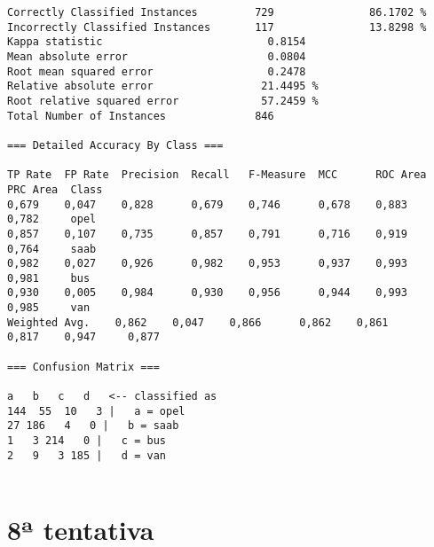 \documentclass[
	article,			%
	11pt,				%
	oneside,			%
	a4paper,			%
	english,			%
	brazil,				%
	sumario=tradicional
	]{abntex2}
\begin{document}
\begin{lstlisting}
Correctly Classified Instances         729               86.1702 %
Incorrectly Classified Instances       117               13.8298 %
Kappa statistic                          0.8154
Mean absolute error                      0.0804
Root mean squared error                  0.2478
Relative absolute error                 21.4495 %
Root relative squared error             57.2459 %
Total Number of Instances              846     

=== Detailed Accuracy By Class ===

TP Rate  FP Rate  Precision  Recall   F-Measure  MCC      ROC Area  PRC Area  Class
0,679    0,047    0,828      0,679    0,746      0,678    0,883     0,782     opel
0,857    0,107    0,735      0,857    0,791      0,716    0,919     0,764     saab
0,982    0,027    0,926      0,982    0,953      0,937    0,993     0,981     bus
0,930    0,005    0,984      0,930    0,956      0,944    0,993     0,985     van
Weighted Avg.    0,862    0,047    0,866      0,862    0,861      0,817    0,947     0,877     

=== Confusion Matrix ===

a   b   c   d   <-- classified as
144  55  10   3 |   a = opel
27 186   4   0 |   b = saab
1   3 214   0 |   c = bus
2   9   3 185 |   d = van


\end{lstlisting}

\newpage

\section{8ª tentativa}
\end{document}
